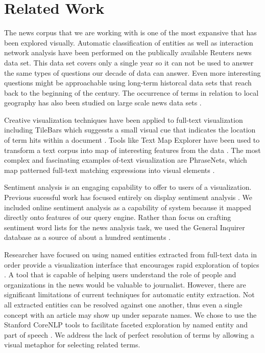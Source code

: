 \section{Related Work}
The news corpus that we are working with is one of the most expansive that has been explored visually.  Automatic classification of entities \cite{wermter2002selforganizing} as well as interaction network analysis \cite{johnson2004network} have been performed on the publically available Reuters news data set.  This data set covers only a single year so it can not be used to answer the same types of questions our decade of data can answer.  Even more interesting questions might be approachable using long-term historcal data sets that reach back to the beginning of the century.  The occurrence of terms in relation to local geography has also been studied on large scale news data sets \cite{mehler2006spatial}.

Creative visualization techniques have been applied to full-text visualization including TileBars which suggessts a small visual cue that indicates the location of term hits within a document \cite{hearst1995tilebars}.  Tools like Text Map Explorer have been used to transform a text corpus into map of interesting features from the data \cite{paulovich2006text}.  The most complex and fascinating examples of-text visualization are PhraseNets, which map patterned full-text matching expressions into visual elements \cite{phrasenets}.

Sentiment analysis is an engaging capability to offer to users of a visualization.  Previous sucessful work has focused entirely on display sentiment analysis \cite{wanner2009visual}.  We included online sentiment analysis as a capability of system because it mapped directly onto features of our query engine.  Rather than focus on crafting sentiment word lists for the news analysis task, we used the General Inquirer database as a source of about a hundred sentiments \cite{generalinquirer}.

Researcher have focused on using named entities extracted from full-text data in order provide a visualization interface that encourages rapid exploration of topics \cite{grobelnik2004visualization}.  A tool that is capable of helping users understand the role of people and organizations in the news would be valuable to journalist.  However, there are significant limitations of current techniques for automatic entity extraction.  Not all extracted entities can be resolved against one another, thus even a single concept with an article may show up under separate names.  We chose to use the Stanford CoreNLP tools to facilitate faceted exploration by named entity and part of speech \cite{finkel2005incorporating,toutanova2003feature}.  We address the lack of perfect resolution of terms by allowing a visual metaphor for selecting related terms.

